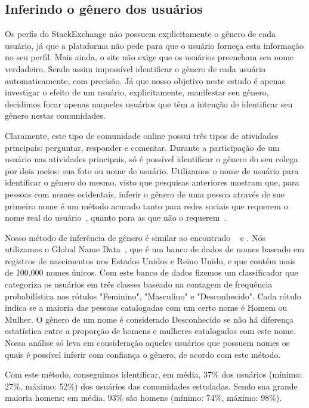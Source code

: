 \subsection{Inferindo o gênero dos usuários}

Os perfis do StackExchange não possuem explicitamente o gênero de cada usuário, já que a plataforma não pede para que o usuário forneça esta informação no seu perfil. Mais ainda, o site não exige que os usuários preencham seu nome verdadeiro. Sendo assim impossível identificar o gênero de cada usuário automaticamente, com precisão. Já que nosso objetivo neste estudo é apenas investigar o efeito de um usuário, explicitamente, manifestar seu gênero, decidimos focar apenas naqueles usuários que têm a intenção de identificar seu gênero nestas comunidades.

Claramente, este tipo de comunidade online possui três tipos de atividades principais: perguntar, responder e comentar. Durante a participação de um usuário nas atividades principais, só é possível identificar o gênero do seu colega por dois meios: sua foto ou nome de usuário. Utilizamos o nome de usuário para identificar o gênero do mesmo, visto que pesquisas anteriores mostram que, para pessoas com nomes ocidentais, inferir o gênero de uma pessoa através de sue primeiro nome é um método acurado tanto para redes sociais que requerem o nome real do usuário~\cite{tang2011s}, quanto para as que não o requerem~\cite{burger2011discriminating}\cite{liu2013s}.

Nosso método de inferência de gênero é similar ao encontrado ~\cite{liu2013s} e \cite{cunha2014he}. Nós utilizamos o Global Name Data~\cite{Hyland:2013:Online}, que é um banco de dados de nomes baseado em registros de nascimentos nos Estados Unidos e Reino Unido, e que contém mais de 100,000 nomes únicos. Com este banco de dados fizemos um classificador que categoriza os usuários em três classes baseado na contagem de frequência probabilística nos rótulos "Feminino", "Masculino" e "Desconhecido". Cada rótulo indica se a maioria das pessoas catalogadas com um certo nome é Homem ou Mulher. O gênero de um nome é considerado Desconhecido se não há diferença estatística entre a proporção de homens e mulheres catalogados com este nome. Nossa análise só leva em consideração aqueles usuários que possuem nomes os quais é possível inferir com confiança o gênero, de acordo com este método.

Com este método, conseguimos identificar, em média, 37\% dos usuários (mínimo: 27\%, máximo: 52\%) dos usuários das comunidades estudadas. Sendo sua grande maioria homens: em média, 93\% são homens (mínimo: 74\%, máximo: 98\%).

